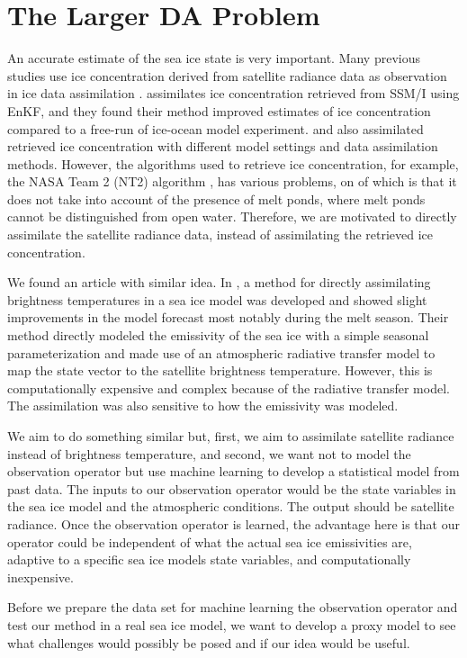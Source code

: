 \documentclass[10pt]{article}
\begin{document}
\section{The Larger DA Problem}

An accurate estimate of the sea ice state is very important. Many  previous studies use ice concentration derived from satellite radiance data as observation in ice data assimilation \cite{Andersen06}. \cite{Lisaeter03} assimilates ice concentration retrieved from SSM/I using EnKF, and they found their method improved estimates of ice concentration compared to a free-run of ice-ocean model experiment. \cite{Caya10} and \cite{Stark10} also assimilated retrieved ice concentration with different model settings and data assimilation methods. However, the algorithms used to retrieve ice concentration, for example, the NASA Team 2 (NT2) algorithm \cite{Markus00}, has various problems, on of which is that it does not take into account of the presence of melt ponds, where melt ponds cannot be distinguished from open water. Therefore, we are motivated to directly assimilate the satellite radiance data, instead of assimilating the retrieved ice concentration.

We found an article with similar idea. In \cite{Scott12}, a method for directly assimilating brightness temperatures in a sea ice model was developed and showed slight improvements in the model forecast most notably during the melt season. Their method directly modeled the emissivity of the sea ice with a simple seasonal parameterization and made use of an atmospheric radiative transfer model to map the state vector to the satellite brightness temperature. However, this is computationally expensive and complex because of the radiative transfer model. The assimilation was also sensitive to how the emissivity was modeled. 

We aim to do something similar but, first, we aim to assimilate satellite radiance instead of brightness temperature, and second, we want not to model the observation operator but use machine learning to develop a statistical model from past data. The inputs to our observation operator would be the state variables in the sea ice model and the atmospheric conditions. The output should be satellite radiance. Once the observation operator is learned, the advantage here is that our operator could be independent of what the actual sea ice emissivities are, adaptive to a specific sea ice models state variables, and computationally inexpensive.

Before we prepare the data set for machine learning the observation operator and test our method in a real sea ice model, we want to develop a proxy model to see what challenges would possibly be posed and if our idea would be useful.
\end{document}
